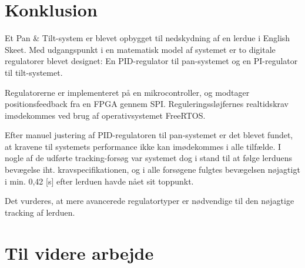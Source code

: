 \section{Konklusion}
\label{sec:konklusion}
Et Pan \& Tilt-system er blevet opbygget til nedskydning af en lerdue i English Skeet.
Med udgangspunkt i en matematisk model af systemet er to digitale regulatorer
blevet designet: En PID-regulator til pan-systemet og en PI-regulator til tilt-systemet.

Regulatorerne er implementeret på en mikrocontroller, og modtager positionsfeedback
fra en FPGA gennem SPI.
Reguleringssløjfernes realtidskrav imødekommes ved brug af operativsystemet FreeRTOS.

Efter manuel justering af PID-regulatoren til pan-systemet er det blevet fundet,
at kravene til systemets performance ikke kan imødekommes i alle tilfælde.
I nogle af de udførte tracking-forsøg var systemet dog i stand til at følge lerduens bevægelse
iht. kravspecifikationen,
og i alle forsøgene fulgtes bevægelsen nøjagtigt i min. 0,42 [s] efter lerduen havde nået sit toppunkt.

Det vurderes, at mere avancerede regulatortyper er nødvendige til den nøjagtige tracking af lerduen.

\section{Til videre arbejde}
